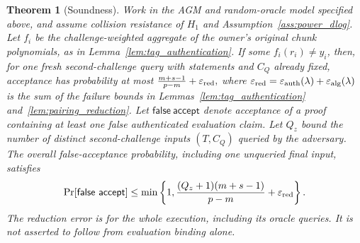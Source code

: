 \documentclass[lettersize,journal]{IEEEtran}
\newtheorem{theorem}{Theorem}
\begin{document}
\begin{theorem}[Soundness]\label{thm:soundness}
Work in the AGM and random-oracle model specified above, and assume collision resistance of $H_1$ and Assumption~\ref{ass:power_dlog}. Let $f_i$ be the challenge-weighted aggregate of the owner's original chunk polynomials, as in Lemma~\ref{lem:tag_authentication}. If some $f_i(r_i)\ne y_i$, then, for one fresh second-challenge query with statements and $C_Q$ already fixed, acceptance has probability at most
$\frac{m+s-1}{p-m}+\varepsilon_{\rm red},$
where $\varepsilon_{\rm red}=\varepsilon_{\rm auth}(\lambda)+\varepsilon_{\rm alg}(\lambda)$ is the sum of the failure bounds in Lemmas~\ref{lem:tag_authentication} and~\ref{lem:pairing_reduction}. Let $\mathsf{false\ accept}$ denote acceptance of a proof containing at least one false authenticated evaluation claim. Let $Q_z$ bound the number of distinct second-challenge inputs $(T,C_Q)$ queried by the adversary. The overall false-acceptance probability, including one unqueried final input, satisfies
\begin{equation}\label{eq:batch_query_bound}
\begin{split}
\Pr[\mathsf{false\ accept}]
\leq\min\left\{1,\frac{(Q_z+1)(m+s-1)}{p-m}
+\varepsilon_{\rm red}\right\}.
\end{split}
\end{equation}
The reduction error is for the whole execution, including its oracle queries. It is not asserted to follow from evaluation binding alone.
\end{theorem}
\end{document}
